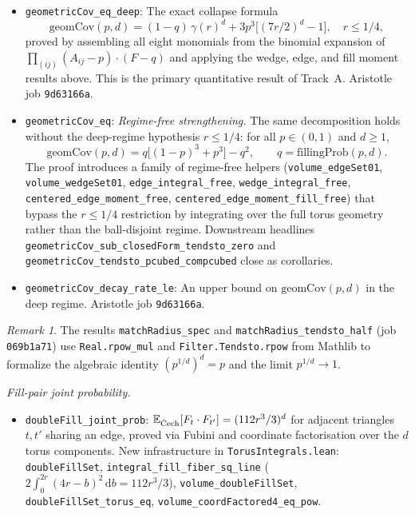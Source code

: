\documentclass[reqno,12pt]{amsart}
\newcommand{\Cech}{\ifmmode\text{\v{C}ech}\else\v{C}ech\fi}  %
\newcommand{\geomCov}{\mathrm{geomCov}}
\newcommand{\fillingP}{\mathrm{fillingProb}}
\newcommand{\EE}{\mathbb{E}}
\newcommand{\lean}[1]{\textup{\texttt{\small #1}}}
\theoremstyle{plain}
\theoremstyle{definition}
\theoremstyle{remark}
\newtheorem{remark}[theorem]{Remark}
\begin{document}
\begin{itemize}[leftmargin=*, itemsep=4pt]
\item \lean{geometricCov\_eq\_deep}: The exact collapse formula
  \[
    \geomCov(p,d) = (1-q)\,\gamma(r)^d + 3p^3\bigl[(7r/2)^d - 1\bigr],
    \quad r \leq 1/4,
  \]
  proved by assembling all eight monomials from the binomial expansion of
  $\prod_{(ij)}(A_{ij}-p)\cdot(F-q)$ and applying the wedge, edge, and fill moment
  results above. This is the primary quantitative result of Track~A.
  Aristotle job \texttt{9d63166a}.

\item \lean{geometricCov\_eq}: \emph{Regime-free strengthening.} The same
  decomposition holds without the deep-regime hypothesis $r \le 1/4$: for all
  $p \in (0,1)$ and $d \ge 1$,
  \[
    \geomCov(p,d) = q\bigl[(1-p)^3 + p^3\bigr] - q^2, \qquad q = \fillingP(p,d).
  \]
  The proof introduces a family of regime-free helpers
  (\lean{volume\_edgeSet01}, \lean{volume\_wedgeSet01},
  \lean{edge\_integral\_free}, \lean{wedge\_integral\_free},
  \lean{centered\_edge\_moment\_free}, \lean{centered\_edge\_moment\_fill\_free})
  that bypass the $r \le 1/4$ restriction by integrating over the full torus
  geometry rather than the ball-disjoint regime. Downstream headlines
  \lean{geometricCov\_sub\_closedForm\_tendsto\_zero} and
  \lean{geometricCov\_tendsto\_pcubed\_compcubed} close as corollaries.

\item \lean{geometricCov\_decay\_rate\_le}: An upper bound on $\geomCov(p,d)$ in the
  deep regime. Aristotle job \texttt{9d63166a}.
\end{itemize}

\begin{remark}
The results \lean{matchRadius\_spec} and \lean{matchRadius\_tendsto\_half} (job
\texttt{069b1a71}) use \texttt{Real.rpow\_mul} and \texttt{Filter.Tendsto.rpow} from
Mathlib to formalize the algebraic identity $(p^{1/d})^d = p$ and the limit $p^{1/d}\to 1$.
\end{remark}

\smallskip\noindent\textit{Fill-pair joint probability.}

\begin{itemize}[leftmargin=*, itemsep=4pt]
\item \lean{doubleFill\_joint\_prob}:
  $\EE_{\Cech}[F_t \cdot F_{t'}] = (112r^3/3)^d$ for adjacent triangles $t, t'$ sharing
  an edge, proved via Fubini and coordinate factorisation over the $d$ torus components.
  New infrastructure in \texttt{TorusIntegrals.lean}: \lean{doubleFillSet},
  \lean{integral\_fill\_fiber\_sq\_line}
  ($2\int_0^{2r}(4r-b)^2\,\mathrm{d}b = 112r^3/3$),
  \lean{volume\_doubleFillSet}, \lean{doubleFillSet\_torus\_eq},
  \lean{volume\_coordFactored4\_eq\_pow}.
\end{itemize}
\end{document}
